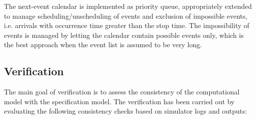 The next-event calendar is implemented as priority queue, appropriately extended to manage scheduling/unscheduling of events and exclusion of impossible events, i.e. arrivals with occurrence time greater than the stop time.
The impossibility of events is managed by letting the calendar contain possible events only, which is the best approach when the event list is assumed to be very long.


\subsection{Verification}
The main goal of verification is to assess the consistency of the computational model with the specification model.
The verification has been carried out by evaluating the following consistency checks based on simulator logs and outputs:


